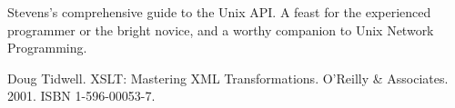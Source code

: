 \documentclass[12pt,oneside]{book}
\begin{document}
\begin{common-format}
\begin{thebibliography}{9}
Stevens's comprehensive guide to the Unix API. A feast for the experienced programmer or the bright novice, and a worthy companion to Unix Network Programming.

%
%
 Doug Tidwell. XSLT: Mastering XML Transformations. O'Reilly \&{}  Associates. 2001. ISBN 1-596-00053-7.
%
%
%
%
%
%
%
%
%
%
\end{thebibliography}



\end{common-format}  
\end{document}
